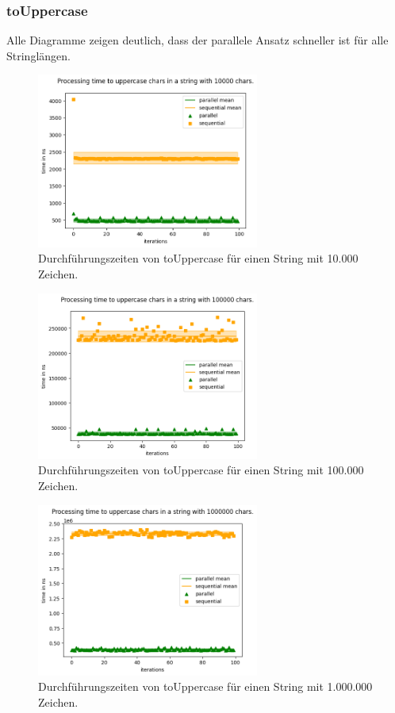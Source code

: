 \documentclass[plainarticle,zihtitle,german,final,hyperref,utf8]{zihpub}
\begin{document}
\subsubsection{toUppercase}
Alle Diagramme zeigen deutlich, dass der parallele Ansatz schneller ist für alle Stringlängen.
\begin{figure}[h]
	\begin{center}
		\includegraphics[width=0.65\textwidth]{images/comp_upper_10000.png}
		\caption{Durchführungszeiten von toUppercase für einen String mit 10.000 Zeichen.}
	\end{center}
\end{figure}\label{fig:up_10k}
\begin{figure}[h]
\begin{center}
	\includegraphics[width=0.65\textwidth]{images/comp_upper_100000.png}
	\caption{Durchführungszeiten von toUppercase für einen String mit 100.000 Zeichen.}
\end{center}
\end{figure}
\begin{figure}[h]
\begin{center}
	\includegraphics[width=0.65\textwidth]{images/comp_upper_1000000.png}
	\caption{Durchführungszeiten von toUppercase für einen String mit 1.000.000 Zeichen.}
\end{center}
\end{figure}
\end{document}
